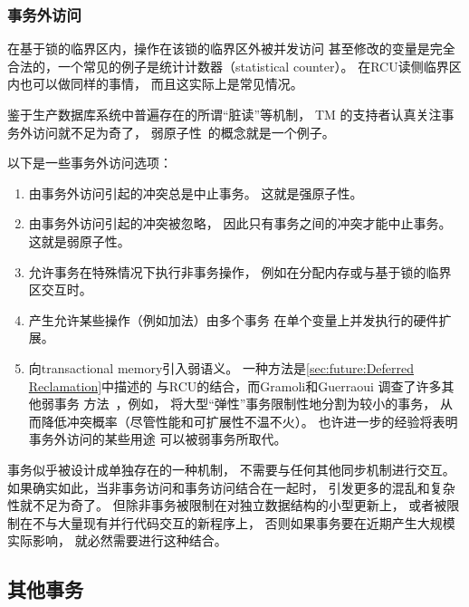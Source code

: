 \subsubsection{事务外访问}
\label{sec:future:Extra-Transactional Accesses}

在基于锁的临界区内，操作在该锁的临界区外被并发访问
甚至修改的变量是完全合法的，一个常见的例子是统计计数器（statistical counter）。
在RCU读侧临界区内也可以做同样的事情，
而且这实际上是常见情况。

鉴于生产数据库系统中普遍存在的所谓``脏读''等机制，
TM 的支持者认真关注事务外访问就不足为奇了，
弱原子性~\cite{Blundell2006TMdeadlock}的概念就是一个例子。

以下是一些事务外访问选项：

\begin{enumerate}
\item	由事务外访问引起的冲突总是中止事务。
	这就是强原子性。
\item	由事务外访问引起的冲突被忽略，
	因此只有事务之间的冲突才能中止事务。
	这就是弱原子性。
\item	允许事务在特殊情况下执行非事务操作，
	例如在分配内存或与基于锁的临界区交互时。
\item	产生允许某些操作（例如加法）由多个事务
	在单个变量上并发执行的硬件扩展。
\item	向transactional memory引入弱语义。
	一种方法是\cref{sec:future:Deferred Reclamation}中描述的
	与RCU的结合，而Gramoli和Guerraoui
	调查了许多其他弱事务
	方法~\cite{Gramoli:2014:DTP:2541883.2541900}，例如，
	将大型``弹性''事务限制性地分割为较小的事务，
	从而降低冲突概率（尽管性能和可扩展性不温不火）。
	也许进一步的经验将表明事务外访问的某些用途
	可以被弱事务所取代。
\end{enumerate}

事务似乎被设计成单独存在的一种机制，
不需要与任何其他同步机制进行交互。
如果确实如此，当非事务访问和事务访问结合在一起时，
引发更多的混乱和复杂性就不足为奇了。
但除非事务被限制在对独立数据结构的小型更新上，
或者被限制在不与大量现有并行代码交互的新程序上，
否则如果事务要在近期产生大规模实际影响，
就必然需要进行这种结合。

\subsection{其他事务}
\label{sec:future:Other Transactions}

